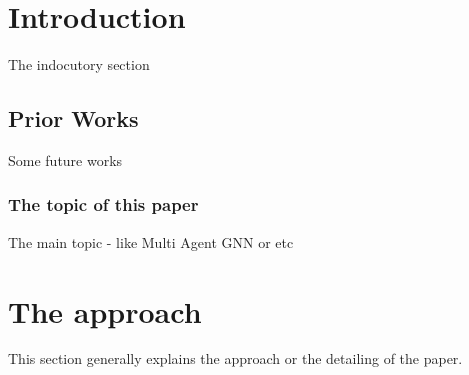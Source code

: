 \documentclass{article}
\begin{document}
	\doublespacing
	\tableofcontents
	\newpage
	\singlespacing
	\section{Introduction}
	The indocutory section
	\subsection{Prior Works}
	Some future works
	\subsubsection{The topic of this paper}
	The main topic - like Multi Agent GNN or etc
	\section{The approach}
	This section generally explains the approach or the detailing of the paper.
\end{document}
